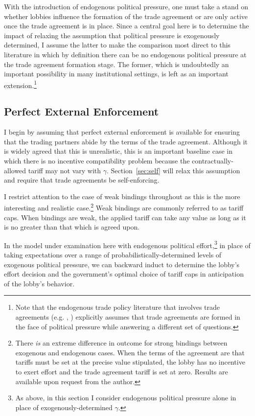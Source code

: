 \documentclass[12pt]{article}
\newcommand{\ga}{\gamma}
\begin{document}
With the introduction of endogenous political pressure, one must take a stand on whether lobbies influence the formation of the trade agreement or are only active once the trade agreement is in place. Since a central goal here is to determine the impact of relaxing the assumption that political pressure is exogenously determined, I assume the latter to make the comparison most direct to this literature in which by definition there can be no endogenous political pressure at the trade agreement formation stage. The former, which is undoubtedly an important possibility in many institutional settings, is left as an important extension.\footnote{Note that the endogenous trade policy literature that involves trade agreements (e.g. \Textcite{gh95}, \Textcite{mrc2007}) explicitly assumes that trade agreements are formed in the face of political pressure while answering a different set of questions.}


\subsection{Perfect External Enforcement}
\label{sec:perfect}
I begin by assuming that perfect external enforcement is available for ensuring that the trading partners abide by the terms of the trade agreement. Although it is widely agreed that this is unrealistic, this is an important baseline case in which there is no incentive compatibility problem because the contractually-allowed tariff may not vary with $\ga$. Section~\ref{sec:self} will relax this assumption and require that trade agreements be self-enforcing.

I restrict attention to the case of weak bindings throughout as this is the more interesting and realistic case.\footnote{There \textit{is} an extreme difference in outcome for strong bindings between exogenous and endogenous cases. When the terms of the agreement are that tariffs must be set at the precise value stipulated, the lobby has no incentive to exert effort and the trade agreement tariff is set at zero. Results are available upon request from the author.} Weak bindings are commonly referred to as tariff caps. When bindings are weak, the applied tariff can take any value as long as it is no greater than that which is agreed upon.

In the model under examination here with endogenous political effort,\footnote{As above, in this section I consider endogenous political pressure alone in place of exogenously-determined $\ga$.} in place of taking expectations over a range of probabilistically-determined levels of exogenous political pressure, we can backward induct to determine the lobby's effort decision and the government's optimal choice of tariff caps in anticipation of the lobby's behavior.
\end{document}
